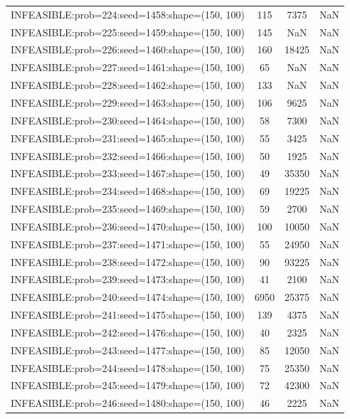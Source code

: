 \begin{longtable}{lccc}
INFEASIBLE:prob=224:seed=1458:shape=(150, 100) &   115 &  7375 &    NaN \\
INFEASIBLE:prob=225:seed=1459:shape=(150, 100) &   145 &   NaN &    NaN \\
INFEASIBLE:prob=226:seed=1460:shape=(150, 100) &   160 & 18425 &    NaN \\
INFEASIBLE:prob=227:seed=1461:shape=(150, 100) &    65 &   NaN &    NaN \\
INFEASIBLE:prob=228:seed=1462:shape=(150, 100) &   133 &   NaN &    NaN \\
INFEASIBLE:prob=229:seed=1463:shape=(150, 100) &   106 &  9625 &    NaN \\
INFEASIBLE:prob=230:seed=1464:shape=(150, 100) &    58 &  7300 &    NaN \\
INFEASIBLE:prob=231:seed=1465:shape=(150, 100) &    55 &  3425 &    NaN \\
INFEASIBLE:prob=232:seed=1466:shape=(150, 100) &    50 &  1925 &    NaN \\
INFEASIBLE:prob=233:seed=1467:shape=(150, 100) &    49 & 35350 &    NaN \\
INFEASIBLE:prob=234:seed=1468:shape=(150, 100) &    69 & 19225 &    NaN \\
INFEASIBLE:prob=235:seed=1469:shape=(150, 100) &    59 &  2700 &    NaN \\
INFEASIBLE:prob=236:seed=1470:shape=(150, 100) &   100 & 10050 &    NaN \\
INFEASIBLE:prob=237:seed=1471:shape=(150, 100) &    55 & 24950 &    NaN \\
INFEASIBLE:prob=238:seed=1472:shape=(150, 100) &    90 & 93225 &    NaN \\
INFEASIBLE:prob=239:seed=1473:shape=(150, 100) &    41 &  2100 &    NaN \\
INFEASIBLE:prob=240:seed=1474:shape=(150, 100) &  6950 & 25375 &    NaN \\
INFEASIBLE:prob=241:seed=1475:shape=(150, 100) &   139 &  4375 &    NaN \\
INFEASIBLE:prob=242:seed=1476:shape=(150, 100) &    40 &  2325 &    NaN \\
INFEASIBLE:prob=243:seed=1477:shape=(150, 100) &    85 & 12050 &    NaN \\
INFEASIBLE:prob=244:seed=1478:shape=(150, 100) &    75 & 25350 &    NaN \\
INFEASIBLE:prob=245:seed=1479:shape=(150, 100) &    72 & 42300 &    NaN \\
INFEASIBLE:prob=246:seed=1480:shape=(150, 100) &    46 &  2225 &    NaN \\

\end{longtable}
